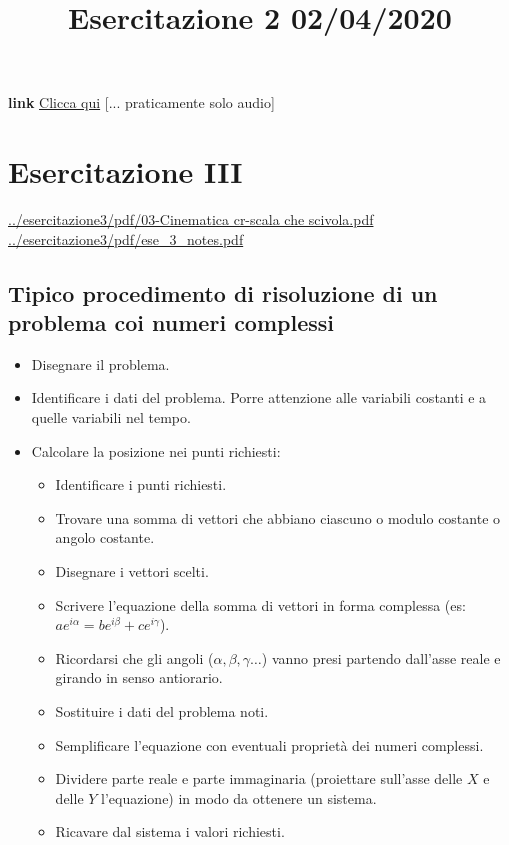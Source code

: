 \title{Esercitazione 2 02/04/2020}\newline
\textbf{link} \href{https://web.microsoftstream.com/video/490e9a91-e0f9-4769-a4ce-f9fc559ed5c1}{Clicca qui} [... praticamente solo audio]
\section{Esercitazione III}
\url{../esercitazione3/pdf/03-Cinematica cr-scala che scivola.pdf}\newline
\url{../esercitazione3/pdf/ese_3_notes.pdf}
\subsection{Tipico procedimento di risoluzione di un problema coi numeri complessi}
\begin{itemize}
    \item Disegnare il problema.
    \item Identificare i dati del problema. Porre attenzione alle variabili costanti e a quelle variabili nel tempo.
    \item Calcolare la posizione nei punti richiesti:
    \begin{itemize}
        \item Identificare i punti richiesti.
        \item Trovare una somma di vettori che abbiano ciascuno o modulo costante o angolo costante.
        \item Disegnare i vettori scelti.
        \item Scrivere l'equazione della somma di vettori in forma complessa (es: $a e^{i \alpha} = b e^{i \beta} + c e^{i \gamma}$).
        \item Ricordarsi che gli angoli ($\alpha, \beta, \gamma\dots$) vanno presi partendo dall'asse reale e girando in senso antiorario.
        \item Sostituire i dati del problema noti.
        \item Semplificare l'equazione con eventuali proprietà dei numeri complessi.
        \item Dividere parte reale e parte immaginaria (proiettare sull'asse delle $X$ e delle $Y$ l'equazione) in modo da ottenere un sistema.
        \item Ricavare dal sistema i valori richiesti.

\end{itemize}
\end{itemize}
